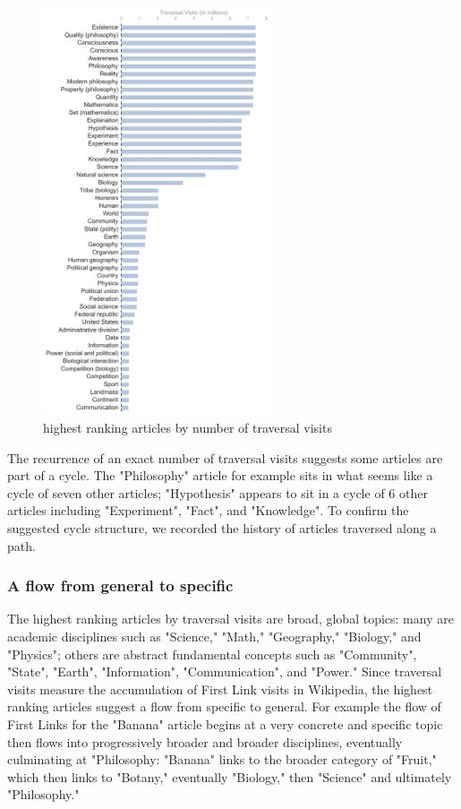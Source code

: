 \documentclass[twoside]{article}
\begin{document}
\begin{figure}[H]
\centering
    \caption{highest ranking articles by number of traversal visits}
        \includegraphics[width=0.6\textwidth]{graphics/articles_ranked.png}
\end{figure}


The recurrence of an exact number of traversal visits suggests some articles are part of a cycle. 
The "Philosophy" article for example sits in what seems like a cycle of seven other articles; "Hypothesis" appears to sit in a 
cycle of 6 other articles including "Experiment", "Fact", and "Knowledge".
To confirm the suggested cycle structure, we recorded the history of articles traversed along a path. 


\subsubsection{A flow from general to specific}

The highest ranking articles by traversal visits are 
broad, global topics: 
many are academic disciplines such as "Science," "Math," 
"Geography," "Biology," and "Physics"; others are abstract fundamental concepts such as 
"Community", "State", "Earth", "Information", "Communication", and "Power."
Since traversal visits measure the accumulation of First Link visits in Wikipedia, 
the highest ranking articles suggest a flow from specific to general. 
For example the flow of First Links for the "Banana" article begins at a very concrete
and specific topic then flows into progressively broader and broader disciplines, eventually 
culminating at "Philosophy: "Banana" links to the broader category of "Fruit," which then links to 
"Botany," eventually "Biology," then "Science" and ultimately "Philosophy." 
\end{document}
